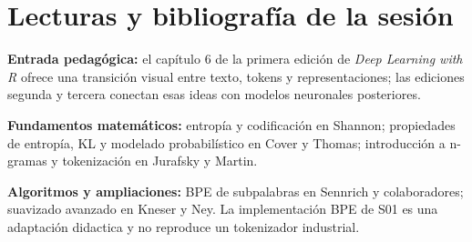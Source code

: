 
\chapter*{Lecturas y bibliografía de la sesión}
\textbf{Entrada pedagógica:} el capítulo 6 de la primera edición de
\emph{Deep Learning with R} ofrece una transición visual entre texto,
tokens y representaciones; las ediciones segunda y tercera conectan esas
ideas con modelos neuronales posteriores.

\textbf{Fundamentos matemáticos:} entropía y codificación en Shannon;
propiedades de entropía, KL y modelado probabilístico en Cover y Thomas;
introducción a n-gramas y tokenización en Jurafsky y Martin.

\textbf{Algoritmos y ampliaciones:} BPE de subpalabras en Sennrich y
colaboradores; suavizado avanzado en Kneser y Ney. La implementación BPE
de S01 es una adaptación didactica y no reproduce un tokenizador industrial.

\nocite{cholletallaire2018,chollet2022,chollet2026,shannon1948,shannon1951,cover2006,sennrich2016,kneser1995,jurafskymartin,rmarkdown}
\renewcommand{\bibname}{Referencias de S01}


